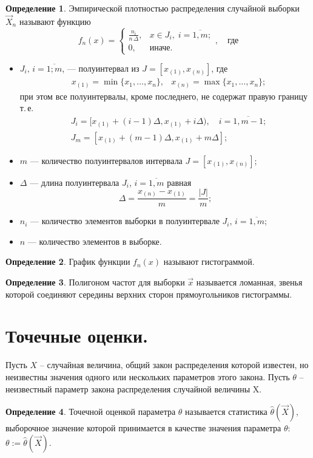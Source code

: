 \documentclass[a4paper, 12pt]{article}
\theoremstyle{definition}
\newtheorem{definition}{Определение}[section]
\theoremstyle{leads}
\theoremstyle{example}
\begin{document}
\begin{definition}
	Эмпирической плотностью распределения случайной выборки $\vec{X}_n$ называют функцию
	\begin{displaymath}
	f_n(x) =
	\begin{cases}
	\frac{n_i}{n \, \Delta}, &x \in J_i,\; i = \overline{1, m};\\
	0, &\text{иначе}.
	\end{cases}, \quad \text{где}
	\end{displaymath}
	\begin{itemize}
		\item $J_i,\, i = \overline{1; m}$, --- полуинтервал из $J = [x_{(1)}, x_{(n)}]$, где 
		\begin{align}
		&x_{(1)} = \min\{ x_1, \dots, x_n \}, &x_{(n)} = \max\{ x_1, \dots, x_n \};
		\end{align}
		при этом все полуинтервалы, кроме последнего, не содержат правую границу т.\,е.
		\begin{align}
		&J_i = [ x_{(1)} + (i-1)\Delta, x_{(1)} + i\Delta), \quad i = \overline{1, m-1};
		\\
		&J_m = [ x_{(1)} + (m-1)\Delta, x_{(1)} + m\Delta];
		\end{align}
		\item $m$ --- количество полуинтервалов интервала $J = [x_{(1)}, x_{(n)}]$;
		\item $\Delta$ --- длина полуинтервала $J_i$, $i = \overline{1, m}$ равная
		\begin{displaymath}
		\Delta = \frac{x_{(n)} - x_{(1)}}{m} = \frac{|J|}{m};
		\end{displaymath}
		\item $n_i$ --- количество элементов выборки в полуинтервале $J_i$, $i = \overline{1, m}$;
		\item $n$ --- количество элементов в выборке.
		
	\end{itemize}
\end{definition}
\begin{definition}
	График функции $f_n(x)$ называют гистограммой.
\end{definition}
\begin{definition}
	Полигоном частот для выборки $\vec{x}$ называется ломанная, звенья которой соединяют середины верхних сторон прямоугольников гистограммы.
\end{definition}

\section{Точечные оценки.}
Пусть $X$ -- случайная величина, общий закон распределения которой известен, но неизвестны значения одного или нескольких параметров этого закона.
Пусть $\theta$ -- неизвестный параметр закона распределения случайной величины X.
\begin{definition}
	Точечной оценкой параметра $\theta$ называется статистика $\hat{\theta}(\vec{X})$, выборочное значение которой принимается в качестве значения параметра $\theta$: $\theta := \hat{\theta}(\vec{X})$.
\end{definition}
\end{document}

